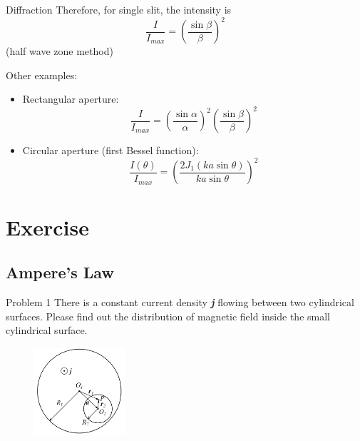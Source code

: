 \documentclass{beamer}
\begin{document}
\begin{frame}{Diffraction}
    Therefore, for single slit, the intensity is
    \begin{equation}
        \frac{I}{I_{max}} = (\frac{\sin\beta}{\beta})^2
    \end{equation}
    (half wave zone method)

    Other examples:
    \begin{itemize}
        \item Rectangular aperture: 
        \begin{equation}
            \frac{I}{I_{max}} = (\frac{\sin\alpha}{\alpha})^2(\frac{\sin\beta}{\beta})^2
        \end{equation}
        \item Circular aperture (first Bessel function): 
        \begin{equation}
            \frac{I(\theta)}{I_{max}} = (\frac{2J_1(ka\sin\theta)}{ka\sin\theta})^2
        \end{equation}
    \end{itemize}
\end{frame}


\section{Exercise}

\subsection{Ampere's Law}

\begin{frame}{Problem 1}
    There is a constant current density \textit{\textbf{j}} flowing between two cylindrical surfaces. Please find out the distribution of magnetic field inside the small cylindrical surface.
    \vfill
    \begin{figure}[H]
        \centering
        \includegraphics[width=0.30\textwidth]{images/008.png}
    \end{figure}
\end{frame}
\end{document}
